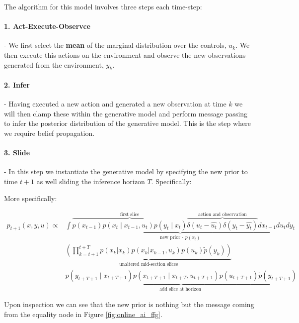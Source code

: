 \documentclass{article}
\begin{document}
The algorithm for this model involves three steps each time-step:

\paragraph{1. Act-Execute-Observce} - We first select the \textbf{mean} of the marginal distribution over the controls, $u_k$. We then execute this actions on the environment and observe the new observations generated from the environment, $y_k$.

\paragraph{2. Infer} - Having executed a new action and generated a new observation at time $k$ we will then clamp these within the generative model and perform message passing to infer the posterior distribution of the generative model. This is the step where we require belief propagation.  

\paragraph{3. Slide} - In this step we instantiate the generative model by specifying the new prior to time $t+1$ as well sliding the inference horizon $T$. Specifically:

More specifically:


\begin{equation}
\begin{aligned}
    p_{t+1}(x, y, u) \propto 
    &\underbrace{\int \overbrace{p\left(x_{t-1}\right) p\left(x_t \mid x_{t-1}, u_t\right) p\left(y_t \mid x_t\right)}^{\text{first slice}} 
    \overbrace{\delta\left(u_t - \widehat{u_t}\right) \delta\left(y_t - \widehat{y_t}\right)}^{\text{action and observation}} dx_{t-1} du_t dy_t}_{\text{new prior - } p(x_t)} \\
    &\underbrace{\left(\prod_{k=t+1}^{t+T} p\left(x_k | x_k\right) p\left(x_k | x_{k-1}, u_k \right) p\left(u_k\right) \tilde{p}\left(y_k\right)\right)}_{\text{unaltered mid-section slices}} \\
    &\underbrace{p\left(y_{t+T+1} \mid x_{t+T+1}\right) p\left(x_{t+T+1} \mid x_{t+T}, u_{t+T+1}\right) p\left(u_{t+T+1}\right) \tilde{p}\left(y_{t+T+1}\right)}_{\text {add slice at horizon }}
\end{aligned}
\end{equation}

Upon inspection we can see that the new prior is nothing but the message coming from the equality node in Figure \ref{fig:online_ai_ffg}. 
\end{document}
